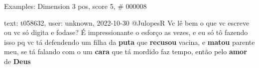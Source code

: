\begin{frame}{Examples: Dimension 3 pos, score 5, \# 000008}
\footnotesize
\begin{exampleblock}{text: t058632, user: unknown, 2022-10-30}
@JulopesR Vc lê bem o que vc escreve ou vc só digita e fodase? É impressionante 
o esforço as vezes, e eu só tô fazendo isso pq vc tá defendendo um filha da 
\textbf{puta} que \textbf{recusou} vacina, e \textbf{matou} parente meu, se tá 
falando com o um \textbf{cara} que tá mordido faz tempo, então pelo 
\textbf{amor} de \textbf{Deus} 
\end{exampleblock}
\end{frame}
